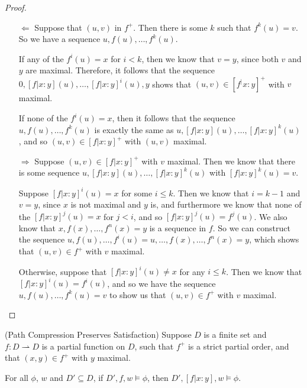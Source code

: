 \begin{proof}
\begin{itemize}
\item[$\Leftarrow$] Suppose that $(u, v)$ in $f^{+}$. Then there is some $k$ such 
that $f^k(u) = v$. So we have a sequence $u, f(u), \ldots, f^k(u)$. 

If any of the $f^i(u) = x$ for $i < k$, then we know that $v = y$,
since both $v$ and $y$ are maximal. Therefore, it follows that the
sequence $0, [f|x:y](u), \ldots, [f|x:y]^i(u), y$ shows that $(u,v)
\in [f^|x:y]^+$ with $v$ maximal.

If none of the $f^i(u) = x$, then it follows that the sequence $u,
f(u), \ldots, f^k(u)$ is exactly the same as $u, [f|x:y](u), \ldots,
[f|x:y]^k(u)$, and so $(u, v) \in [f|x:y]^+$ with $(u,v)$ maximal.

\item[$\Rightarrow$] Suppose $(u,v) \in [f|x:y]^{+}$ with $v$
  maximal. Then we know that there is some sequence $u, [f|x:y](u),
  \ldots, [f|x:y]^k(u)$ with $[f|x:y]^k(u) = v$.

Suppose $[f|x:y]^i(u) = x$ for some $i \leq k$. Then we know that $i =
k-1$ and $v = y$, since $x$ is not maximal and $y$ is, and furthermore
we know that none of the $[f|x:y]^j(u) = x$ for $j < i$, and so
$[f|x:y]^j(u) = f^j(u)$. We also know that $x, f(x), \ldots, f^n(x) =
y$ is a sequence in $f$. So we can construct the sequence $u, f(u),
\ldots, f^i(u) = u, \ldots, f(x), \ldots, f^n(x) = y$, which shows
that $(u,v) \in f^+$ with $v$ maximal.

Otherwise, suppose that $[f|x:y]^i(u) \not= x$ for any $i \leq
k$. Then we know that $[f|x:y]^i(u) = f^i(u)$, and so we have the
sequence $u, f(u), \ldots, f^k(u) = v$ to show us that $(u,v) \in f^+$ with
$v$ maximal.
\end{itemize}
\end{proof}

\begin{lemma}{(Path Compression Preserves Satisfaction)}
Suppose $D$ is a finite set and $f : D \rightharpoonup D$ is a partial function on $D$,
such that $f^{+}$ is a strict partial order, and that $(x,y) \in f^{+}$ with $y$ maximal.

For all $\phi$, $w$ and $D' \subseteq D$, if $D', f, w \models \phi$, then $D', [f|x:y], w \models \phi$.  
\end{lemma}

